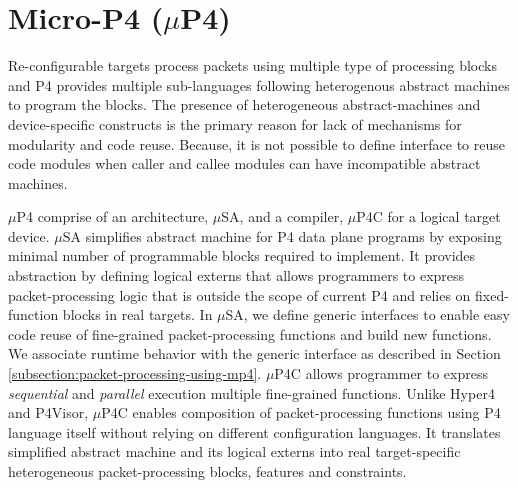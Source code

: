 \section{Micro-P4 \;($\mu$P4)}
Re-configurable targets process packets using multiple type of processing blocks and P4 provides multiple sub-languages following heterogenous abstract machines to program the blocks.
The presence of heterogeneous abstract-machines and device-specific constructs is the
primary reason for lack of mechanisms for modularity and code reuse.
Because, it is not possible to define interface to reuse code modules when caller and callee modules can have incompatible abstract machines.


$\mu$P4 comprise of an architecture, $\mu$SA, and a compiler, $\mu$P4C for a logical target device. 
$\mu$SA simplifies abstract machine for P4 data plane programs by exposing minimal number of programmable blocks required to implement.
It provides abstraction by defining logical externs that allows programmers to express packet-processing logic that is outside the scope of current P4 and relies on fixed-function blocks in real targets.
In $\mu$SA, we define generic interfaces to enable easy code reuse of fine-grained packet-processing functions and build new functions.
We associate runtime behavior with the generic interface as described in Section \ref{subsection:packet-processing-using-mp4}. 
$\mu$P4C allows programmer to express \emph{sequential} and \emph{parallel} execution multiple fine-grained functions.
Unlike Hyper4 and P4Visor, $\mu$P4C enables composition of packet-processing functions using P4 language itself without relying on different configuration languages.
It translates simplified abstract machine and its logical externs into real target-specific heterogeneous packet-processing blocks, features and constraints.


